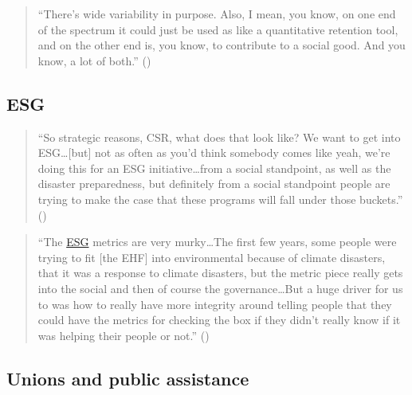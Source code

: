 \documentclass[
  11pt,
  oneside]{article}
\begin{document}
\begin{quote}
``There's wide variability in purpose. Also, I mean, you know, on one end of the spectrum it could just be used as like a quantitative retention tool, and on the other end is, you know, to contribute to a social good. And you know, a lot of both.'' ()
\end{quote}

\subsection{ESG}\label{esg}

\begin{quote}
``So strategic reasons, CSR, what does that look like? We want to get into ESG\ldots{[}but{]} not as often as you'd think somebody comes like yeah, we're doing this for an ESG initiative\ldots from a social standpoint, as well as the disaster preparedness, but definitely from a social standpoint people are trying to make the case that these programs will fall under those buckets.'' ()
\end{quote}

\begin{quote}
``The \hyperref[esg]{ESG} metrics are very murky\ldots The first few years, some people were trying to fit {[}the EHF{]} into environmental because of climate disasters, that it was a response to climate disasters, but the metric piece really gets into the social and then of course the governance\ldots But a huge driver for us to was how to really have more integrity around telling people that they could have the metrics for checking the box if they didn't really know if it was helping their people or not.'' ()
\end{quote}

\subsection{Unions and public assistance}\label{unions-and-public-assistance}
\end{document}
